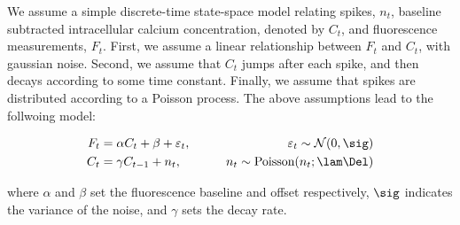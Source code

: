 We assume a simple discrete-time state-space model relating spikes, $n_t$, baseline subtracted intracellular calcium concentration, denoted by $C_t$, and fluorescence measurements, $F_t$.  First, we assume a linear relationship between $F_t$ and $C_t$, with gaussian noise.  Second, we assume that $C_t$ jumps after each spike, and then decays according to some time constant.  Finally, we assume that spikes are distributed according to a Poisson process. The above assumptions lead to the follwoing model:


\begin{align}
F_t &= \alpha C_t + \beta +  \varepsilon_t, \qquad &\varepsilon_t \sim \mathcal{N}(0,\sig) \label{eq:obs} \\
C_t  &= \gamma  C_{t-1} + n_t,  \qquad &n_t \sim \text{Poisson}(n_t; \lam \Del) \label{eq:trans}  
\end{align}

\noindent where $\alpha$ and $\beta$ set the fluorescence baseline and offset respectively, $\sig$ indicates the variance of the noise, and $\gamma$ sets the decay rate. %


